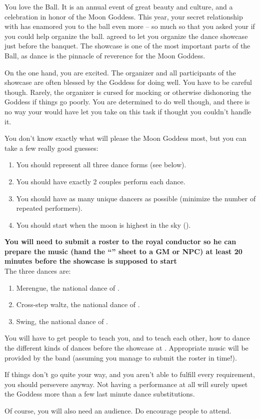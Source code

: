 \documentclass[green]{NeptuneBall}
\begin{document}
\name{\gDance{}}

You love the \cExExKing{} Ball. It is an annual event of great beauty and culture, and a celebration in honor of the Moon Goddess. This year, your secret relationship with \cDiplomat{} has enamored you to the ball even more -- so much so that you asked your \cKing{\parent} if you could help organize the ball. \cKing{} agreed to let you organize the dance showcase just before the banquet. The showcase is one of the most important parts of the Ball, as dance is the pinnacle of reverence for the Moon Goddess.

On the one hand, you are excited. The organizer and all participants of the showcase are often blessed by the Goddess for doing well. You have to be careful though. Rarely, the organizer is cursed for mocking or otherwise dishonoring the Goddess if things go poorly. You are determined to do well though, and there is no way your \cKing{\parent} would have let you take on this task if \cKing{\they} thought you couldn't handle it.

You don't know exactly what will please the Moon Goddess most, but you can take a few really good guesses:
\begin{enumerate}
	\item You should represent all three dance forms (see below).
	\item You should have exactly 2 couples perform each dance.
	\item You should have as many unique dancers as possible (minimize the number of repeated performers).
	\item You should start when the moon is highest in the sky (\cTOneFifty{}).
\end {enumerate}
\vspace{5mm}
{\bf You will need to submit a roster to the royal conductor so he can prepare the music (hand the ``\gRoster{}'' sheet to a GM or NPC) at least 20 minutes before the showcase is supposed to start}\\

The three dances are:
\begin{enumerate}
\item Merengue, the national dance of \pAtlantis{}.
\item Cross-step waltz, the national dance of \pPacifica{}.
\item Swing, the national dance of \pAmerica{}.
\end{enumerate}

You will have to get people to teach you, and to teach each other, how to dance the different kinds of dances before the showcase at {\bf \cTOneFifty{}}. Appropriate music will be provided by the band (assuming you manage to submit the roster in time!).

If things don't go quite your way, and you aren't able to fulfill every requirement, you should persevere anyway. Not having a performance at all will surely upset the Goddess more than a few last minute dance substitutions.

Of course, you will also need an audience. Do encourage people to attend.
\end{document}
